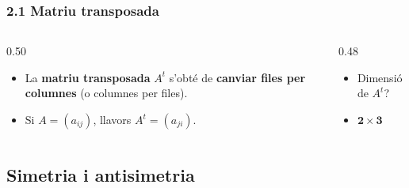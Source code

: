 \documentclass[aspectratio=169]{beamer}
\newcommand{\solucio}[1]{{\color{margueVerdFosc}\ensuremath{\mathbf{#1}}}}
\begin{document}
\begin{frame}[t]
  \frametitle{2.1 Matriu transposada}

  \vspace{-0.28cm}
  \begin{columns}[T,onlytextwidth]
    \begin{column}{0.50\textwidth}
      \begin{itemize}
        \item<1-> La \textbf{matriu transposada} $A^t$ s'obté de \textbf{canviar files per columnes} (o columnes per files).
        \item<2-> Si $A = (a_{ij})$, llavors $A^t = (a_{ji})$.
      \end{itemize}
    \end{column}

    \begin{column}{0.48\textwidth}
      \begin{itemize}
        \item<10-> Dimensió de $A^t$?
        \item<11-> \solucio{2 \times 3}
      \end{itemize}
    \end{column}
  \end{columns}
\end{frame}

\subsection{Simetria i antisimetria}
\end{document}
